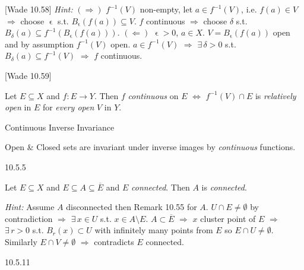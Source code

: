 \documentclass[10pt]{article} %
\newcommand{\cw}[1]{[Wade #1]}
\newcommand{\Hint}{\vspace{0.2em}\textit{Hint: }}
\begin{document}
\begin{multicols}{3}
\begin{theorem}{\cw{10.58}}{}
    \Hint $(\Rightarrow)$ $f^{-1}(V)$ non-empty, let $a \in f^{-1}(V)$, i.e. $f(a) \in V$ $\Rightarrow$ choose $\upvarepsilon$ s.t. $B_{\upvarepsilon}(f(a)) \subseteq V$. $f$ continuous $\Rightarrow$ choose $\delta$ s.t. $B_{\delta}(a) \subseteq f^{-1}(B_{\upvarepsilon}(f(a)))$. $(\Leftarrow)$ $\upvarepsilon > 0$, $a \in X$. $V = B_{\upvarepsilon}(f(a))$ open and by assumption $f^{-1}(V)$ open. $a \in f^{-1}(V)$ $\Rightarrow$ $\exists \, \delta > 0$ s.t. $B_{\delta}(a) \subseteq f^{-1}(V)$ $\Rightarrow$ $f$ continuous.

\end{theorem}

\begin{corollary}{\cw{10.59}}{}

    Let $E \subseteq X$ and $f: E \to Y$. Then $f$ \emph{continuous} on $E$ $\Leftrightarrow$ $f^{-1}(V) \cap E$ is \emph{relatively open} in $E$ for \emph{every open} $V$ in $Y$.

\end{corollary}

\begin{remark}{}{Continuous Inverse Invariance}

    Open \& Closed sets are invariant under inverse images by \emph{continuous} functions.

\end{remark}

\begin{exercise}{10.5.5}{}

    Let $E \subseteq X$ and $E \subseteq A \subseteq \overline{E}$ and $E$ \emph{connected}. Then $A$ is \emph{connected}.

    \Hint Assume $A$ disconnected then Remark 10.55 for $A$. $U \cap E \neq \emptyset$ by contradiction $\Rightarrow$ $\exists \, x \in U$ s.t. $x \in A \setminus E$. $A \subset \overline{E}$ $\Rightarrow$ $x$ cluster point of $E$ $\Rightarrow$ $\exists \, r > 0$ s.t. $B_r(x) \subset U$ with infinitely many points from $E$ so $E \cap U \neq \emptyset$. Similarly $E \cap V \neq \emptyset$ $\Rightarrow$ contradicts $E$ connected.

\end{exercise}

\begin{exercise}{10.5.11}{}


\end{exercise}
\end{multicols}
\end{document}
